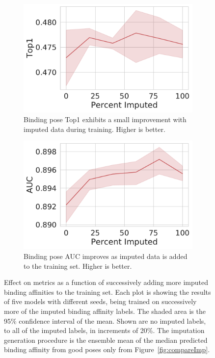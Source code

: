 \documentclass[journal=jmcmar,manuscript=article]{achemso}
\begin{document}
\begin{figure}[tbph]
    \begin{subfigure}[t]{0.48\textwidth}
        \centering
        \includegraphics[width=\linewidth]{figures/MedGOEns_addingImpTop1.pdf}
        \caption{Binding pose Top1 exhibits a small improvement with imputed data during training. Higher is better.}
    \end{subfigure}
    \hfill
    \begin{subfigure}[t]{0.48\textwidth}
        \centering
        \includegraphics[width=\linewidth]{figures/MedGOEns_addingImpAUC.pdf}
        \caption{Binding pose AUC improves as imputed data is added to the training set. Higher is better.}
    \end{subfigure}
    \caption{Effect on metrics as a function of successively adding more imputed binding affinities to the training set. Each plot is showing the results of five models with different seeds, being trained on successively more of the imputed binding affinity labels. The shaded area is the 95\% confidence interval of the mean.  Shown are no imputed labels, to all of the imputed labels, in increments of 20\%. The imputation generation procedure is the ensemble mean of the median predicted binding affinity from good poses only from Figure~\ref{fig:compareImp}.}
    \label{fig:medGOEnsAdding}
\end{figure}
\end{document}
